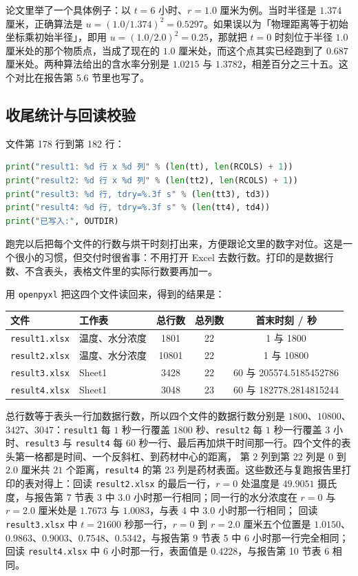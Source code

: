 论文里举了一个具体例子：以 $t=6$ 小时、$r=1.0$ 厘米为例。当时半径是 $1.374$ 厘米，正确算法是 $u=(1.0/1.374)^2=0.5297$。如果误以为「物理距离等于初始坐标乘初始半径」，即用 $u=(1.0/2.0)^2=0.25$，那就把 $t=0$ 时刻位于半径 $1.0$ 厘米处的那个物质点，当成了现在的 $1.0$ 厘米处，而这个点其实已经跑到了 $0.687$ 厘米处。两种算法给出的含水率分别是 $1.0215$ 与 $1.3782$，相差百分之三十五。这个对比在报告第 5.6 节里也写了。

\subsection{收尾统计与回读校验}

文件第 178 行到第 182 行：

\begin{lstlisting}[language=Python]
print("result1: %d 行 x %d 列" % (len(tt), len(RCOLS) + 1))
print("result2: %d 行 x %d 列" % (len(tt2), len(RCOLS) + 1))
print("result3: %d 行, tdry=%.3f s" % (len(tt3), td3))
print("result4: %d 行, tdry=%.3f s" % (len(tt4), td4))
print("已写入:", OUTDIR)
\end{lstlisting}

跑完以后把每个文件的行数与烘干时刻打出来，方便跟论文里的数字对位。这是一个很小的习惯，但交付时很省事：不用打开 Excel 去数行数。打印的是数据行数、不含表头，表格文件里的实际行数要再加一。

用 \texttt{openpyxl} 把这四个文件读回来，得到的结果是：
\begin{center}
\begin{tabular}{@{}llccc@{}}
\toprule
文件 & 工作表 & 总行数 & 总列数 & 首末时刻 / 秒 \\
\midrule
\texttt{result1.xlsx} & 温度、水分浓度 & 1801 & 22 & 1 与 1800 \\
\texttt{result2.xlsx} & 温度、水分浓度 & 10801 & 22 & 1 与 10800 \\
\texttt{result3.xlsx} & Sheet1 & 3428 & 22 & 60 与 205574.5185452786 \\
\texttt{result4.xlsx} & Sheet1 & 3048 & 23 & 60 与 182778.2814815244 \\
\bottomrule
\end{tabular}
\end{center}

总行数等于表头一行加数据行数，所以四个文件的数据行数分别是 $1800$、$10800$、$3427$、$3047$：\texttt{result1} 每 $1$ 秒一行覆盖 $1800$ 秒、\texttt{result2} 每 $1$ 秒一行覆盖 $3$ 小时、\texttt{result3} 与 \texttt{result4} 每 $60$ 秒一行、最后再加烘干时间那一行。四个文件的表头第一格都是时间、一个反斜杠、到药材中心的距离，
第 $2$ 列到第 $22$ 列是 $0$ 到 $2.0$ 厘米共 $21$ 个距离，\texttt{result4} 的第 $23$ 列是药材表面。这些数还与复跑报告里打印的表对得上：回读 \texttt{result2.xlsx} 的最后一行，$r=0$ 处温度是 $49.9051$ 摄氏度，与报告第 7 节表 3 中 $3.0$ 小时那一行相同；同一行的水分浓度在 $r=0$ 与 $r=2.0$ 厘米处是 $1.7673$ 与 $1.0083$，与表 4 中 $3.0$ 小时那一行相同；
回读 \texttt{result3.xlsx} 中 $t=21600$ 秒那一行，$r=0$ 到 $r=2.0$ 厘米五个位置是 $1.0150$、$0.9863$、$0.9003$、$0.7548$、$0.5342$，与报告第 9 节表 5 中 $6$ 小时那一行完全相同；回读 \texttt{result4.xlsx} 中 $6$ 小时那一行，表面值是 $0.4228$，与报告第 10 节表 6 相同。

